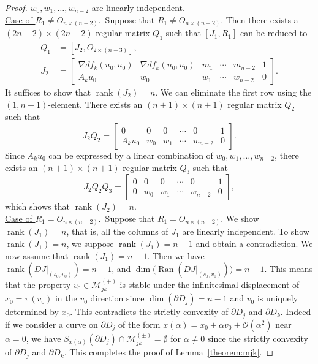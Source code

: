 \documentclass[a4paper,11pt,reqno]{amsart}
\numberwithin{equation}{section}
\theoremstyle{definition}
\theoremstyle{remark}
\begin{document}
\begin{proof}
$w_0,w_1,\dotsc,w_{n-2}$ are linearly independent. 
%
%
\vspace{6pt}
\\
\underline{Case of $R_1{\ne}O_{n\times(n-2)}$}.\ 
Suppose that $R_1{\ne}O_{n\times(n-2)}$. 
Then there exists a $(2n-2)\times(2n-2)$ regular matrix $Q_1$ such that 
$[J_1,R_1]$ can be reduced to
%
%
\begin{align*}
  [J_1,R_1]Q_1
&  =
   [J_2,O_{2\times(n-3)}],
\\
  J_2
& =
  \begin{bmatrix}
  \nabla{df_k}(u_0,u_0) 
  & 
  \nabla{df_k}(u_0,u_0)
  &
  m_1
  & 
  \dotsb 
  & 
  m_{n-2}
  & 
  1 
  \\
  A_ku_0  
  &
  w_0
  &
  w_1
  &
  \dotsb
  &
  w_{n-2}
  & 
  0
  \end{bmatrix}.
\end{align*}
%
%
It suffices to show that $\operatorname{rank}(J_2)=n$. 
We can eliminate the first row using the $(1,n+1)$-element. 
There exists an $(n+1)\times(n+1)$ regular matrix $Q_2$ such that 
%
%
$$
J_2Q_2
=
\begin{bmatrix}
0
& 
0
&
0
& 
\dotsb 
& 
0
& 
1 
\\
A_ku_0  
&
w_0
&
w_1
&
\dotsb
&
w_{n-2}
& 
0
\end{bmatrix}.
$$
%
%
Since $A_ku_0$ can be expressed by a linear combination of 
$w_0,w_1,\dotsc,w_{n-2}$, there exists 
an $(n+1)\times(n+1)$ regular matrix $Q_3$ such that
%
%
$$
J_2Q_2Q_3
=
\begin{bmatrix}
0
& 
0
&
0
& 
\dotsb 
& 
0
& 
1 
\\
0
&
w_0
&
w_1
&
\dotsb
&
w_{n-2}
& 
0
\end{bmatrix}, 
$$
%
%
which shows that $\operatorname{rank}(J_2)=n$. 
%
% 
\vspace{6pt}
\\
\underline{Case of $R_1=O_{n\times(n-2)}$}.\ 
Suppose that $R_1=O_{n\times(n-2)}$. 
We show $\operatorname{rank}(J_1)=n$, that is, 
all the columns of $J_1$ are linearly independent. 
To show $\operatorname{rank}(J_1)=n$, 
we suppose $\operatorname{rank}(J_1)=n-1$ and obtain a contradiction. 
We now assume that $\operatorname{rank}(J_1)=n-1$. 
Then we have 
$\operatorname{rank}(DJ\vert_{(s_0,v_0)})=n-1$, and 
$\operatorname{dim}\bigl(\operatorname{Ran}(DJ\vert_{(s_0,v_0)})\bigr)=n-1$. 
This means that the property $v_0 \in \mathcal{M}_{jk}^{(+)}$ 
is stable under the infinitesimal displacement of $x_0=\pi(v_0)$ 
in the $v_0$ direction since $\operatorname{dim}(\partial{D_j})=n-1$ 
and $v_0$ is uniquely determined by $x_0$. 
This contradicts the strictly convexity of 
$\partial{D_j}$ and $\partial{D_k}$. 
Indeed if we consider a curve on $\partial{D_j}$ of the form 
$x(\alpha)=x_0+\alpha{v_0}+\mathcal{O}(\alpha^2)$ near $\alpha=0$, 
we have $S_{x(\alpha)}(\partial{D_j})\cap\mathcal{M}_{jk}^{(\pm)}=\emptyset$ for $\alpha\ne0$ 
since the strictly convexity of $\partial{D_j}$ and $\partial{D_k}$. 
This completes the proof of Lemma~\ref{theorem:mjk}.
\end{proof}
\end{document}
